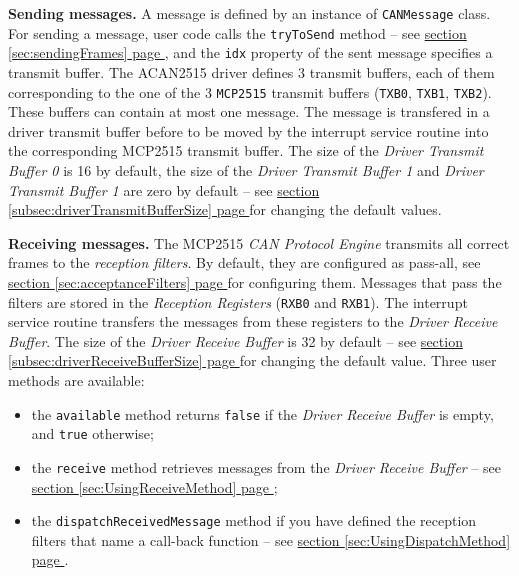 \documentclass[10pt, a4paper, obeyspaces]{extarticle}
\newcommand\refSectionPage[1]{\hyperref[sec:#1]{section \ref*{sec:#1} page \pageref{sec:#1}}}
\newcommand\refSubsectionPage[1]{\hyperref[subsec:#1]{section \ref*{subsec:#1} page \pageref{subsec:#1}}}
\begin{document}
{\bf Sending messages.} A message is defined by an instance of \texttt{CANMessage} class. For sending a message, user code calls the \texttt{tryToSend} method -- see \refSectionPage{sendingFrames}, and the \texttt{idx} property of the sent message specifies a transmit buffer. The ACAN2515 driver defines 3 transmit buffers, each of them corresponding to the one of the 3 \texttt{MCP2515} transmit buffers (\texttt{TXB0}, \texttt{TXB1}, \texttt{TXB2}). These buffers can contain at most one message. The message is  transfered in a driver transmit buffer before to be moved by the interrupt service routine into the corresponding MCP2515 transmit buffer. The size of the \emph{Driver Transmit Buffer 0} is 16 by default, the size of the \emph{Driver Transmit Buffer 1} and \emph{Driver Transmit Buffer 1} are zero by default  -- see \refSubsectionPage{driverTransmitBufferSize} for changing the default values.



{\bf Receiving messages.} The MCP2515 \emph{CAN Protocol Engine} transmits all correct frames to the \emph{reception filters}. By default, they are configured as pass-all, see \refSectionPage{acceptanceFilters} for configuring them. Messages that pass the filters are stored in the \emph{Reception Registers} (\texttt{RXB0} and \texttt{RXB1}). The interrupt service routine transfers the messages from these registers to the \emph{Driver Receive Buffer}. The size of the \emph{Driver Receive Buffer} is 32 by default -- see \refSubsectionPage{driverReceiveBufferSize} for changing the default value. Three user methods are available:
\begin{itemize}
  \item the \texttt{available} method returns \texttt{false} if the \emph{Driver Receive Buffer} is empty, and \texttt{true} otherwise;
  \item the \texttt{receive} method retrieves messages from the \emph{Driver Receive Buffer} -- see \refSectionPage{UsingReceiveMethod};
  \item the \texttt{dispatchReceivedMessage} method if you have defined the reception filters that name a call-back function -- see \refSectionPage{UsingDispatchMethod}.
\end{itemize}
\end{document}
